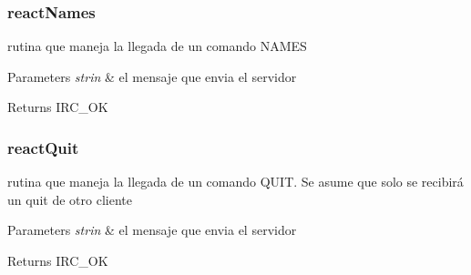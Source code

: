  \hypertarget{reactNames}{}\subsubsection{react\-Names}\label{reactNames}
rutina que maneja la llegada de un comando N\-A\-M\-E\-S


\begin{DoxyParams}{Parameters}
{\em strin} & el mensaje que envia el servidor\\
\hline
\end{DoxyParams}
\begin{DoxyReturn}{Returns}
I\-R\-C\-\_\-\-O\-K
\end{DoxyReturn}


 \hypertarget{reactQuit}{}\subsubsection{react\-Quit}\label{reactQuit}
rutina que maneja la llegada de un comando Q\-U\-I\-T. Se asume que solo se recibirá un quit de otro cliente


\begin{DoxyParams}{Parameters}
{\em strin} & el mensaje que envia el servidor\\
\hline
\end{DoxyParams}
\begin{DoxyReturn}{Returns}
I\-R\-C\-\_\-\-O\-K
\end{DoxyReturn}


 